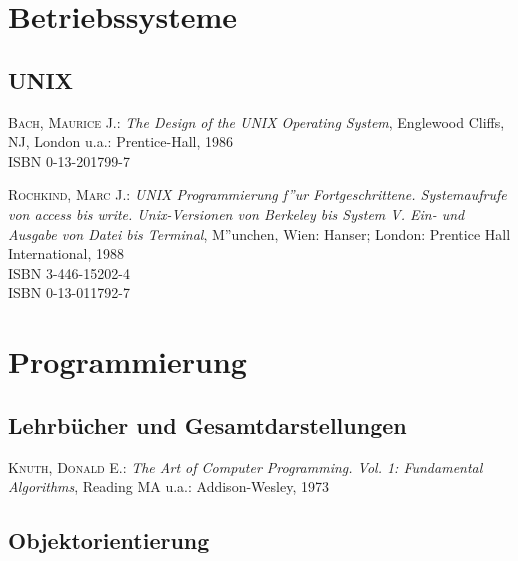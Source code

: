 

\section{Betriebssysteme}

\subsection{UNIX}

\begin{description}
  
\item \textsc{Bach, Maurice J.}: \textit{The Design of the UNIX
    Operating System}, Englewood Cliffs, NJ, London u.a.: Prentice-Hall, 1986 \\
  ISBN 0-13-201799-7
  
\item \textsc{Rochkind, Marc J.}: \textit{UNIX Programmierung f''ur
    Fortgeschrittene. Systemaufrufe von access bis write.
    Unix-Versionen von Berkeley bis System V. Ein- und Ausgabe von
    Datei bis Terminal}, M''unchen, Wien: Hanser; London: Prentice
  Hall
  International, 1988 \\
  ISBN 3-446-15202-4 \\
  ISBN 0-13-011792-7

\end{description}


\section{Programmierung}

\subsection{Lehrb\"ucher und Gesamtdarstellungen}

\begin{description}
  
\item \textsc{Knuth, Donald E.}: \textit{The Art of Computer
    Programming.  Vol. 1: Fundamental Algorithms}, Reading MA u.a.:
  Addison-Wesley, 1973

\end{description}

\subsection{Objektorientierung}

